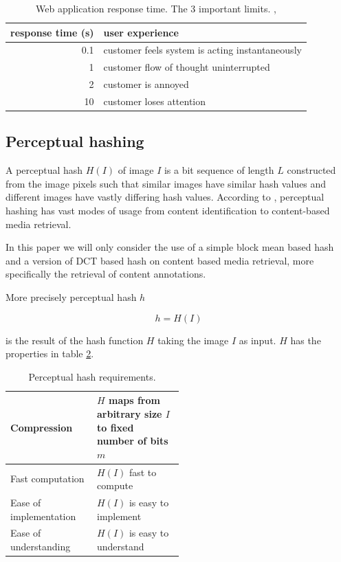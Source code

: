 \documentclass[english,12pt,a4paper,pdftex,elec,utf8]{aaltothesis}
\begin{document}
\def\arraystretch{1.5}
\begin{table}[htb]
\caption{Web application response time. The 3 important limits. \cite{Miller1968},\cite{Nielsen1993}}
\label{webresponsetimes}
\begin{center}
  \begin{tabular}{rl}
    \hline
  response time (s) & user experience\\
  \hline
  0.1 & customer feels system is acting instantaneously\\
  1 & customer flow of thought uninterrupted\\
  2 & customer is annoyed\\
  10 & customer loses attention\\
  \hline
\end{tabular}
\end{center}\end{table}


\subsection{Perceptual hashing}
A perceptual hash $H(I)$ of image $I$ is a bit sequence of length $L$ constructed from the image pixels such that similar images have similar hash values and different images have vastly differing hash values. According to \cite{Zauner2010}, perceptual hashing has vast modes of usage from content identification to content-based media retrieval.

In this paper we will only consider the use of a simple block mean based hash and a version of DCT based hash on content based media retrieval, more specifically the retrieval of content annotations.

More precisely perceptual hash $h$

\begin{equation}\label{hashfunction}
h = H(I)
\end{equation}

is the result of the hash function $H$ taking the image $I$ as input. $H$ has the properties in table \ref{hashcriteria}.

\def\arraystretch{1.5}
\begin{table}[htb]
\caption{Perceptual hash requirements. \cite{Zauner2010}}
\label{hashcriteria}
\begin{center}
\begin{tabular}{lp{0.5\linewidth}}
  \hline \hline
  Compression & $H$ maps from arbitrary size $I$ to fixed number of bits $m$\\
  \hline
  Fast computation & $H(I)$ fast to compute \\
  \hline
  Ease of implementation & $H(I)$ is easy to implement\\
  \hline
  Ease of understanding & $H(I)$ is easy to understand\\
  \hline
\end{tabular}
\end{center}\end{table}
\end{document}
